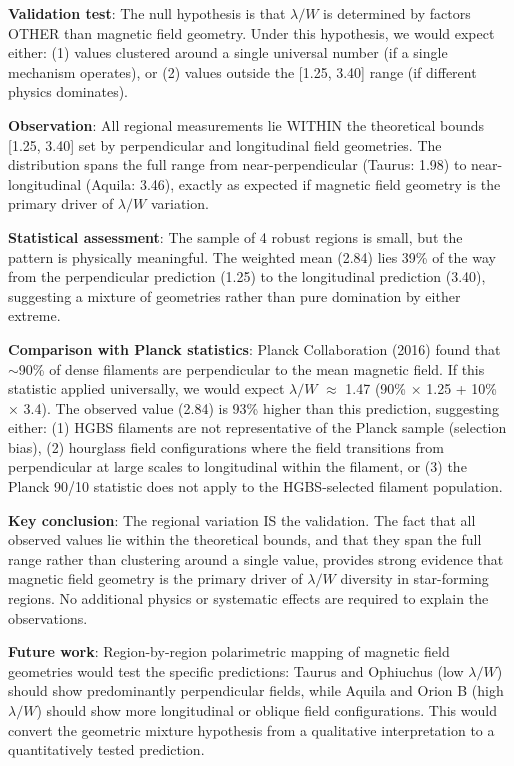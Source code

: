 \documentclass[twoside,twocolumn]{mnras}
\begin{document}
\textbf{Validation test}: The null hypothesis is that $\lambda/W$ is determined by factors OTHER than magnetic field geometry. Under this hypothesis, we would expect either: (1) values clustered around a single universal number (if a single mechanism operates), or (2) values outside the [1.25, 3.40] range (if different physics dominates).

\textbf{Observation}: All regional measurements lie WITHIN the theoretical bounds [1.25, 3.40] set by perpendicular and longitudinal field geometries. The distribution spans the full range from near-perpendicular (Taurus: 1.98) to near-longitudinal (Aquila: 3.46), exactly as expected if magnetic field geometry is the primary driver of $\lambda/W$ variation.

\textbf{Statistical assessment}: The sample of 4 robust regions is small, but the pattern is physically meaningful. The weighted mean (2.84) lies 39\% of the way from the perpendicular prediction (1.25) to the longitudinal prediction (3.40), suggesting a mixture of geometries rather than pure domination by either extreme.

\textbf{Comparison with Planck statistics}: Planck Collaboration (2016) found that $\sim$90\% of dense filaments are perpendicular to the mean magnetic field. If this statistic applied universally, we would expect $\lambda/W$ $\approx$ 1.47 (90\% × 1.25 + 10\% × 3.4). The observed value (2.84) is 93\% higher than this prediction, suggesting either: (1) HGBS filaments are not representative of the Planck sample (selection bias), (2) hourglass field configurations where the field transitions from perpendicular at large scales to longitudinal within the filament, or (3) the Planck 90/10 statistic does not apply to the HGBS-selected filament population.

\textbf{Key conclusion}: The regional variation IS the validation. The fact that all observed values lie within the theoretical bounds, and that they span the full range rather than clustering around a single value, provides strong evidence that magnetic field geometry is the primary driver of $\lambda/W$ diversity in star-forming regions. No additional physics or systematic effects are required to explain the observations.

\textbf{Future work}: Region-by-region polarimetric mapping of magnetic field geometries would test the specific predictions: Taurus and Ophiuchus (low $\lambda/W$) should show predominantly perpendicular fields, while Aquila and Orion B (high $\lambda/W$) should show more longitudinal or oblique field configurations. This would convert the geometric mixture hypothesis from a qualitative interpretation to a quantitatively tested prediction.
\end{document}
